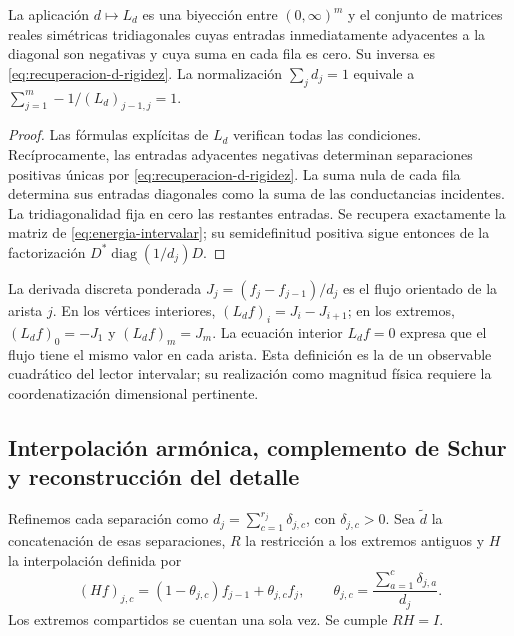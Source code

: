 \begin{proposition}
\label{prop:energia-bidireccional}
La aplicación \(d\mapsto L_d\) es una biyección entre
\((0,\infty)^m\) y el conjunto de matrices reales simétricas
tridiagonales cuyas entradas inmediatamente adyacentes a la diagonal son
negativas y cuya suma en cada fila es cero. Su inversa es
\eqref{eq:recuperacion-d-rigidez}. La normalización \(\sum_jd_j=1\)
equivale a \(\sum_{j=1}^m-1/(L_d)_{j-1,j}=1\).
\end{proposition}
\begin{proof}
Las fórmulas explícitas de \(L_d\) verifican todas las condiciones.
Recíprocamente, las entradas adyacentes negativas determinan separaciones
positivas únicas por \eqref{eq:recuperacion-d-rigidez}. La suma nula de
cada fila determina sus entradas diagonales como la suma de las
conductancias incidentes. La tridiagonalidad fija en cero las restantes
entradas. Se recupera exactamente la matriz de
\eqref{eq:energia-intervalar}; su semidefinitud positiva sigue entonces
de la factorización \(D^*\operatorname{diag}(1/d_j)D\).
\end{proof}

La derivada discreta ponderada
\(J_j=(f_j-f_{j-1})/d_j\) es el flujo orientado de la arista \(j\).
En los vértices interiores, \((L_df)_i=J_i-J_{i+1}\); en los extremos,
\((L_df)_0=-J_1\) y \((L_df)_m=J_m\). La ecuación interior
\(L_df=0\) expresa que el flujo tiene el mismo valor en cada arista.
Esta definición es la de un observable cuadrático del lector intervalar;
su realización como magnitud física requiere la coordenatización dimensional pertinente.

\subsection{Interpolación armónica, complemento de Schur y reconstrucción del detalle}

Refinemos cada separación como
\(d_j=\sum_{c=1}^{r_j}\delta_{j,c}\), con \(\delta_{j,c}>0\).
Sea \(\widetilde d\) la concatenación de esas separaciones, \(R\) la
restricción a los extremos antiguos y \(H\) la interpolación definida por
\begin{equation}
 (Hf)_{j,c}=(1-\theta_{j,c})f_{j-1}+\theta_{j,c}f_j,
 \qquad
 \theta_{j,c}=\frac{\sum_{a=1}^c\delta_{j,a}}{d_j}.
 \label{eq:interpolacion-armonica-k}
\end{equation}
Los extremos compartidos se cuentan una sola vez. Se cumple \(RH=I\).


